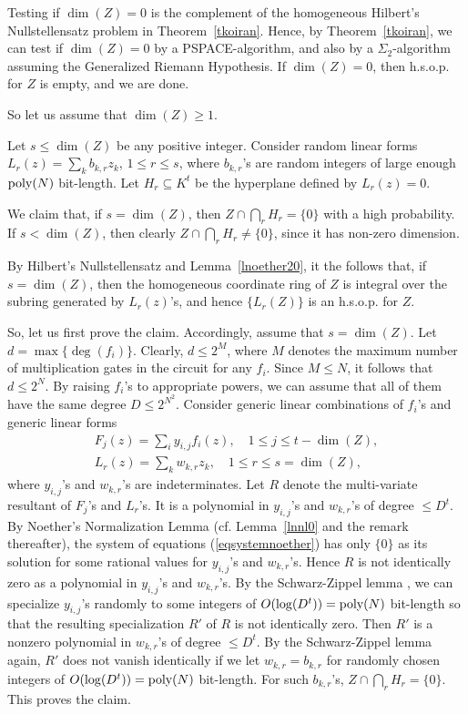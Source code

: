 \documentclass[11pt]{article}
\begin{document}
Testing if $\dim(Z)=0$ is 
the complement  of  the homogeneous
Hilbert's Nullstellensatz problem  in Theorem~\ref{tkoiran}. Hence, 
by Theorem~\ref{tkoiran}, 
we can test if $\dim(Z)=0$ by  a  PSPACE-algorithm, and also by a $\Sigma_2$-algorithm
assuming the Generalized Riemann Hypothesis. If $\dim(Z)=0$, then h.s.o.p. for $Z$ is empty,
and we are done.

So let us assume   that $\dim(Z) \ge 1$. 

Let $s \le \dim(Z)$ be any positive  integer.
Consider  random linear forms $L_r(z)=\sum_k b_{k,r} z_k$, $1 \le r \le s$, where 
$b_{k,r}$'s are random integers of large enough ${\mbox {poly}}(N)$ bit-length. 
Let  $H_r \subseteq K^t$ be  the hyperplane defined by $L_r(z)=0$. 

We claim that, if $s=\dim(Z)$, then 
$Z\cap \bigcap_{r} H_r = \{0\}$ with a high probability. If $s< \dim(Z)$, then clearly 
$Z\cap \bigcap_{r} H_r \not =  \{0\}$, since it has non-zero dimension.

By Hilbert's Nullstellensatz and Lemma~\ref{lnoether20}, it  the follows that,
 if $s=\dim(Z)$, then
the homogeneous coordinate ring of $Z$ is integral over the subring generated by $L_r(z)$'s, and hence $\{L_r(Z)\}$ is  an h.s.o.p. for $Z$.


So, let us first prove the claim.
Accordingly, assume that $s=\dim(Z)$.
Let $d=\max\{\deg(f_i)\}$. Clearly, $d \le 2^M$, where $M$ denotes the maximum 
number of multiplication gates  in the circuit for any $f_i$. 
Since $M \le N$, it follows
that $d \le 2^N$. 
By raising $f_i$'s to appropriate powers, we can assume that all of them have the same degree $D \le 2^{N^2}$. 
Consider generic  linear combinations of $f_i$'s and generic linear forms
\begin{equation} \label{eqsystemnoether} 
\begin{array}{l} 
F_j(z)=\sum_i y_{i,j} f_i(z), \quad 1 \le j \le t-\dim(Z), \\
L_r(z)=\sum_k w_{k,r} z_k, \quad 1 \le r \le s=\dim(Z), 
\end{array}
\end{equation}
where $y_{i,j}$'s and $w_{k,r}$'s are indeterminates. 
Let $R$ denote the multi-variate resultant of $F_j$'s and $L_r$'s. It is a polynomial in $y_{i,j}$'s and $w_{k,r}$'s 
of degree $\le D^t$. By  Noether's Normalization Lemma (cf. Lemma~\ref{lnnl0} and the remark thereafter), 
the system of equations (\ref{eqsystemnoether}) has only $\{0\}$ as its
solution for some rational  values for  $y_{i,j}$'s and $w_{k,r}$'s. Hence $R$ is not identically zero as a polynomial
in $y_{i,j}$'s and $w_{k,r}$'s. 
By the Schwarz-Zippel lemma \cite{schwarz}, we can specialize $y_{i,j}$'s randomly to some integers
of $O(\log (D^t))={\mbox {poly}}(N)$ bit-length  so that the resulting specialization $R'$ of $R$ is not
identically zero. Then $R'$ is  a nonzero polynomial in $w_{k,r}$'s of degree $\le D^t$.
By the Schwarz-Zippel lemma again, $R'$ does not vanish  identically if we let $w_{k,r}=b_{k,r}$ for 
randomly chosen integers  of   $O(\log (D^t))={\mbox {poly}}(N)$ bit-length.   For such $b_{k,r}$'s, 
$Z\cap \bigcap_r H_r = \{0\}$. This proves the claim. 
\end{document}
